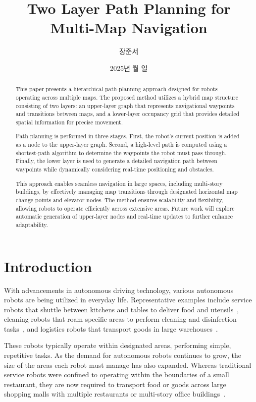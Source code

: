 \documentclass[en]{snu-cse-bsc-thesis}
\title{Two Layer Path Planning for Multi-Map Navigation}
\author{장준서}
\date{2025년 월 일}
\begin{document}
\maketitle

\begin{abstract}
This paper presents a hierarchical path-planning approach designed for robots operating across multiple maps. The proposed method utilizes a hybrid map structure consisting of two layers: an upper-layer graph that represents navigational waypoints and transitions between maps, and a lower-layer occupancy grid that provides detailed spatial information for precise movement.  

Path planning is performed in three stages. First, the robot's current position is added as a node to the upper-layer graph. Second, a high-level path is computed using a shortest-path algorithm to determine the waypoints the robot must pass through. Finally, the lower layer is used to generate a detailed navigation path between waypoints while dynamically considering real-time positioning and obstacles.  

This approach enables seamless navigation in large spaces, including multi-story buildings, by effectively managing map transitions through designated horizontal map change points and elevator nodes. The method ensures scalability and flexibility, allowing robots to operate efficiently across extensive areas. Future work will explore automatic generation of upper-layer nodes and real-time updates to further enhance adaptability.

\end{abstract}

\tableofcontents
\listoftables
\listoffigures

\chapter{Introduction}\label{chap:introduction}
With advancements in autonomous driving technology, various autonomous robots are being utilized in everyday life. Representative examples include service robots that shuttle between kitchens and tables to deliver food and utensils~\cite{ServiPlus}, cleaning robots that roam specific areas to perform cleaning and disinfection tasks~\cite{ServiAir}, and logistics robots that transport goods in large warehouses~\cite{Carti100}.

These robots typically operate within designated areas, performing simple, repetitive tasks. As the demand for autonomous robots continues to grow, the size of the areas each robot must manage has also expanded. Whereas traditional service robots were confined to operating within the boundaries of a small restaurant, they are now required to transport food or goods across large shopping malls with multiple restaurants or multi-story office buildings~\cite{ServiLift}.
\end{document}
